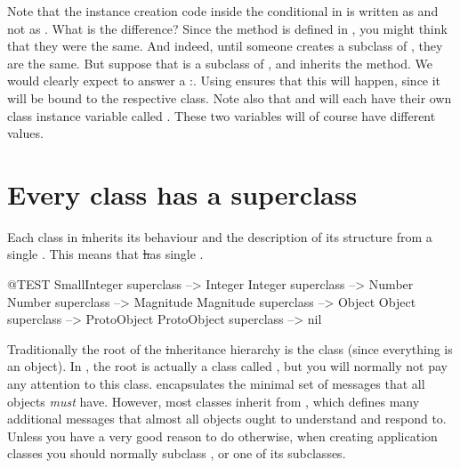 \documentclass[a4paper,10pt,twoside]{book}
\begin{document}
Note that the instance creation code inside the conditional in  is written as  and not as .
What is the difference?   Since the  method is defined in , you might think that they were the same.    And indeed, until someone creates a subclass of , they are the same.  But suppose that  is a subclass of , and inherits the  method.  We would clearly expect  to answer a :. Using \self ensures that this will happen, since it will be bound to the respective class.
Note also that  and  will each have their own class instance variable called .  These two variables will of course have different values.

\section{Every class has a superclass}


Each class in \st inherits its behaviour and the description of its structure from a single .
This means that \st has single .

\begin{code}{@TEST}
SmallInteger superclass --> Integer
Integer superclass          --> Number
Number superclass        --> Magnitude
Magnitude superclass    --> Object
Object superclass           --> ProtoObject
ProtoObject superclass  --> nil
\end{code}

Traditionally the root of the \st inheritance hierarchy is the class  (since everything is an object).
In \pharo, the root is actually a class called , but you will normally not pay any attention to this class.
 encapsulates the minimal set of messages that all objects \emph{must} have.  However, most classes inherit from , which defines many additional messages that almost all objects ought to understand and respond to.
Unless you have a very good reason to do otherwise, when creating application classes you should normally subclass , or one of its subclasses.

\end{document}
